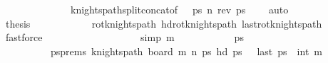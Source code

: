 \begin{isabellebody}
\ \ \ \ \ \ \ \ \ \ \ \ \ \ knights{\isacharunderscore}{\kern0pt}path{\isacharunderscore}{\kern0pt}split{\isacharunderscore}{\kern0pt}concat{\isacharbrackleft}{\kern0pt}of\ {}\ {}\ {\isacharquery}{\kern0pt}ps\ {\isachardoublequoteopen}n{\isacharminus}{\kern0pt}{}{\isachardoublequoteclose}\ {\isachardoublequoteopen}rev\ ps\ {\isachardoublequoteopen}{\isacharparenleft}{\kern0pt}{}{\isacharcomma}{\kern0pt}{}{\isacharparenright}{\kern0pt}{\isachardoublequoteclose}\ {\isachardoublequoteopen}{\isacharparenleft}{\kern0pt}{}{\isacharcomma}{\kern0pt}{}{\isacharparenright}{\kern0pt}{\isachardoublequoteclose}{\isacharbrackright}{\kern0pt}\ \isamarkupfalse%
\ auto\isanewline
\ \ \ \ \ \ \ \ \isamarkupfalse%
\ \isamarkupfalse%
\ {\isacharquery}{\kern0pt}thesis\isanewline
\ \ \ \ \ \ \ \ \ \ \isamarkupfalse%
\ rot{}{}{\isacharunderscore}{\kern0pt}knights{\isacharunderscore}{\kern0pt}path\ hd{\isacharunderscore}{\kern0pt}rot{}{}{\isacharunderscore}{\kern0pt}knights{\isacharunderscore}{\kern0pt}path\ last{\isacharunderscore}{\kern0pt}rot{}{}{\isacharunderscore}{\kern0pt}knights{\isacharunderscore}{\kern0pt}path\ \isamarkupfalse%
\ fastforce\isanewline
\ \ \ \ \ \ \isamarkupfalse%
\isanewline
\ \ \ \ \isamarkupfalse%
\isanewline
\ \ \ \ \ \ \isamarkupfalse%
\ {\isacharbrackleft}{\kern0pt}simp{\isacharbrackright}{\kern0pt}{\isacharcolon}{\kern0pt}\ {\isachardoublequoteopen}m\ {\isacharequal}{\kern0pt}\ {}{\isachardoublequoteclose}\isanewline
\ \ \ \ \ \ \isamarkupfalse%
\ \isamarkupfalse%
\ ps\ \ \isanewline
\ \ \ \ \ \ \ \ \ \ ps{\isacharunderscore}{\kern0pt}prems{\isacharcolon}{\kern0pt}\ {\isachardoublequoteopen}knights{\isacharunderscore}{\kern0pt}path\ {\isacharparenleft}{\kern0pt}board\ m\ n{\isacharparenright}{\kern0pt}\ ps{\isachardoublequoteclose}\ {\isachardoublequoteopen}hd\ ps\ {\isacharequal}{\kern0pt}\ {\isacharparenleft}{\kern0pt}{}{\isacharcomma}{\kern0pt}{}{\isacharparenright}{\kern0pt}{\isachardoublequoteclose}\ {\isachardoublequoteopen}last\ ps\ {\isacharequal}{\kern0pt}\ {\isacharparenleft}{\kern0pt}int\ m{\isacharminus}{\kern0pt}{}{\isacharcomma}{\kern0pt}{}{\isacharparenright}{\kern0pt}{\isachardoublequoteclose}\isanewline

\end{isabellebody}
